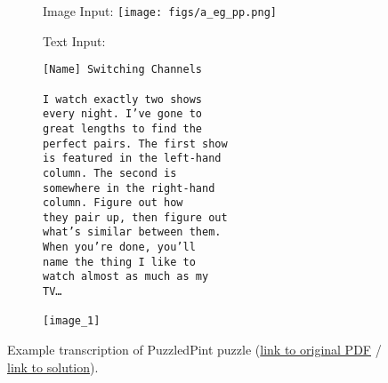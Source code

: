 \begin{figure}[H]
\vspace{-10pt}
\begin{subfigure}[b]{0.45\textwidth}
Image Input: \vfill
\texttt{[image: figs/a\_eg\_pp.png]}
\label{fig:eg_pp}
\end{subfigure}
\hfill
\begin{subfigure}[b]{0.45\textwidth}
Text Input:
\begin{verbatim}
[Name] Switching Channels

I watch exactly two shows
every night. I’ve gone to
great lengths to find the
perfect pairs. The first show
is featured in the left-hand
column. The second is
somewhere in the right-hand
column. Figure out how
they pair up, then figure out
what’s similar between them.
When you’re done, you’ll
name the thing I like to
watch almost as much as my
TV…

[image_1]
\end{verbatim}
\end{subfigure}
\caption{Example transcription of PuzzledPint puzzle (\href{https://github.com/PuzzledPint/puzzled_pint_archives/blob/main/archives/2015/06/01-switching_channels-puzzle.pdf}{link to original PDF} / \href{https://github.com/PuzzledPint/puzzled_pint_archives/blob/main/archives/2015/06/01-switching_channels-solution.pdf}{link to solution}).}
\end{figure}